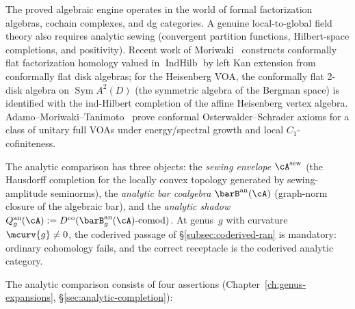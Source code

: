 The proved algebraic engine operates in the world of formal
factorization algebras, cochain complexes, and dg categories. A
genuine local-to-global field theory also requires analytic sewing
(convergent partition functions, Hilbert-space completions, and
positivity). Recent work of
Moriwaki~\cite{Moriwaki26a, Moriwaki26b} constructs conformally flat
factorization homology valued in $\operatorname{IndHilb}$ by left Kan
extension from conformally flat disk algebras; for the Heisenberg
VOA, the conformally flat 2-disk algebra on
$\operatorname{Sym} A^2(D)$ (the symmetric algebra of the Bergman
space) is identified with the ind-Hilbert completion of the affine
Heisenberg vertex algebra. Adamo--Moriwaki--Tanimoto~\cite{AMT24}
prove conformal Osterwalder--Schrader axioms for a class of unitary
full VOAs under energy/spectral growth and local $C_1$-cofiniteness.

The analytic comparison has three objects: the \emph{sewing envelope}
$\cA^{\mathrm{sew}}$ (the Hausdorff completion for the locally convex
topology generated by sewing-amplitude seminorms), the \emph{analytic
bar coalgebra} $\barB^{\mathrm{an}}(\cA)$ (graph-norm closure of the
algebraic bar), and the \emph{analytic shadow}
$Q_g^{\mathrm{an}}(\cA) := D^{\mathrm{co}}(
\barB_g^{\mathrm{an}}(\cA)\text{-comod})$. At genus~$g$ with
curvature $\mcurv{g} \neq 0$, the coderived passage of
\S\ref{subsec:coderived-ran} is mandatory: ordinary cohomology fails,
and the correct receptacle is the coderived analytic category.

The analytic comparison consists of four assertions
(Chapter~\ref{ch:genus-expansions},
\S\ref{sec:analytic-completion}):

